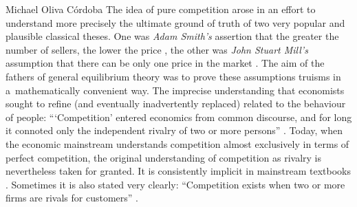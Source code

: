 \begin{artengenv}{Michael Oliva Córdoba}
The idea of pure competition arose in an effort to understand more precisely the ultimate ground of truth of two very popular and plausible classical theses. One was \textit{Adam Smith's} assertion that the greater the number of sellers, the lower the price 
\parencite[][pp.68–69]{smith_inquiry_1776}, %
 the other was \textit{John Stuart Mill's} assumption that there can be only one price in the market 
\parencite[][p.291]{mill_principles_1848}. %
 The aim of the fathers of general equilibrium theory was to prove these assumptions truisms in a~mathematically convenient way. The imprecise understanding that economists sought to refine (and eventually inadvertently replaced) related to the behaviour of people: ``‘Competition' entered economics from common discourse, and for long it connoted only the independent rivalry of two or more persons'' 
\parencite[][p.1]{stigler_perfect_1957}. %
 Today, when the economic mainstream understands competition almost exclusively in terms of perfect competition, the original understanding of competition as rivalry is nevertheless taken for granted. It is consistently implicit in mainstream textbooks 
\parencites[cf.][p.357]{acemoglu_microeconomics_2016}[][p.281 et passim]{pindyck_microeconomics_2013}[][172f.]{samuelson_economics_2009}[p.241 et passim; among others][]{stiglitz_economics_2006}. %
 Sometimes it is also stated very clearly: ``Competition exists when two or more firms are rivals for customers'' 
\parencite[][p.42]{mankiw_economics_2014}.%





\end{artengenv}
